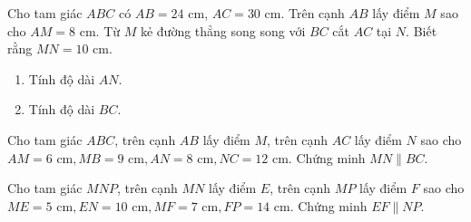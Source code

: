 \begin{bt}%
	Cho tam giác $ABC$ có $AB=24\text{ cm}$, $AC=30\text{ cm}$. Trên cạnh $AB$ lấy điểm $M$ sao cho $AM=8\text{ cm}$. Từ $M$ kẻ đường thẳng song song với $BC$ cắt $AC$ tại $N$. Biết rằng $MN=10\text{ cm}$.
	\begin{enumerate}
		\item Tính độ dài $AN$.
		\item Tính độ dài $BC$.
	\end{enumerate}
\end{bt}

\begin{bt}%
	Cho tam giác $ABC$, trên cạnh $AB$ lấy điểm $M$, trên cạnh $AC$ lấy điểm $N$ sao cho $AM = 6\text{ cm}, MB = 9\text{ cm}, AN = 8\text{ cm}, NC = 12\text{ cm}$. Chứng minh $MN \parallel BC$.
\end{bt}

\begin{bt}%
	Cho tam giác $MNP$, trên cạnh $MN$ lấy điểm $E$, trên cạnh $MP$ lấy điểm $F$ sao cho $ME = 5\text{ cm}, EN = 10\text{ cm}, MF = 7\text{ cm}, FP = 14\text{ cm}$. Chứng minh $EF \parallel NP$.
\end{bt}

